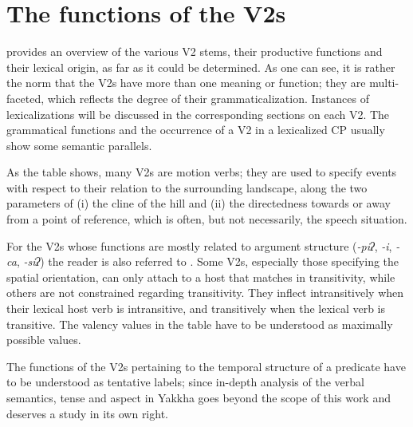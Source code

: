 \section{The functions of the V2s}\label{verb-verb-functional}

 provides an overview of the various V2 stems, their productive functions and their lexical origin, as far as it could be determined. As one can see, it is rather the norm that the V2s have more than one meaning or function; they are multi-faceted, which reflects the degree of their grammaticalization. Instances of lexicalizations will be discussed in the corresponding sections on each V2. The grammatical functions and the occurrence of a V2 in a lexicalized CP usually show some semantic parallels. 

As the table shows, many V2s are motion verbs; they are used to specify events with respect to their  relation to the surrounding landscape, along the two para\-meters of (i) the cline of the hill and (ii) the directedness towards or away from a point of reference, which is often, but not necessarily, the speech situation. 

For the V2s whose functions are mostly related to argument structure (\emph{-piʔ}, \emph{-i}, \emph{-ca}, \emph{-siʔ}) the reader is also referred to . Some V2s, especially those specifying the spatial  orientation,  can  only attach to a host that matches in transitivity, while others are not constrained regarding transitivity. They inflect intransitively when their lexical host  verb is intransitive, and transitively when the lexical verb is transitive. The valency values in the table have to be understood as maximally possible values.

The functions of the V2s pertaining to the temporal structure of a predicate have to be understood as tentative labels; since in-depth analysis of the verbal semantics, tense and aspect in Yakkha goes beyond the scope of this work and deserves a study in its own right.





